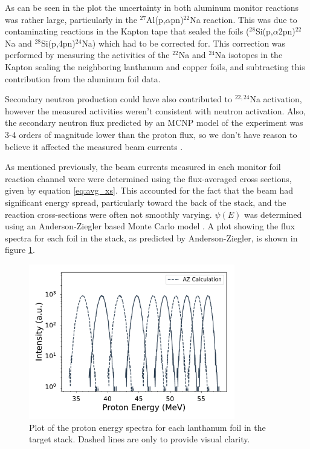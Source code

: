 \documentclass[aps,superscriptaddress,twocolumn,secnumarabic,balancelastpage,amsmath,amssymb,nofootinbib,floatfix]{revtex4-1}
\begin{document}
As can be seen in the plot the uncertainty in both aluminum monitor reactions was rather large, particularly in the $^{27}$Al(p,$\alpha$pn)$^{22}$Na reaction.  This was due to contaminating reactions in the Kapton tape that sealed the foils ($^{28}$Si(p,$\alpha$2pn)$^{22}$Na and $^{28}$Si(p,4pn)$^{24}$Na) which had to be corrected for.  This correction was performed by measuring the activities of the $^{22}$Na and $^{24}$Na isotopes in the Kapton sealing the neighboring lanthanum and copper foils, and subtracting this contribution from the aluminum foil data.

Secondary neutron production could have also contributed to $^{22,24}$Na activation, however the measured activities weren't consistent with neutron activation. Also, the secondary neutron flux predicted by an MCNP model of the experiment was 3-4 orders of magnitude lower than the proton flux, so we don't have reason to believe it affected the measured beam currents \cite{MCNP}.

As mentioned previously, the beam currents measured in each monitor foil reaction channel were were determined using the flux-averaged cross sections, given by equation \ref{eq:avg_xs}.  This accounted for the fact that the beam had significant energy spread, particularly toward the back of the stack, and the reaction cross-sections were often not smoothly varying.  $\psi(E)$ was determined using an Anderson-Ziegler based Monte Carlo model \cite{ZIEGLER20101818}.  A plot showing the flux spectra for each foil in the stack, as predicted by Anderson-Ziegler, is shown in figure \ref{fig:az_spectrum}.

\begin{figure}[htb]
\includegraphics[width=9cm]{monitors/La_az_spectrum}
\caption{Plot of the proton energy spectra for each lanthanum foil in the target stack.  Dashed lines are only to provide visual clarity.
}
\label{fig:az_spectrum}
\end{figure}
\end{document}
